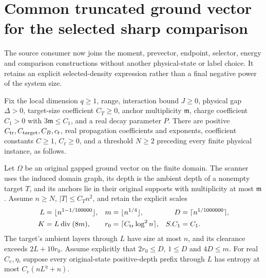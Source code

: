 \section{Common truncated ground vector for the selected sharp comparison}
\label{sec:arealaw-source-selected-sharp-comparison}

The source consumer now joins the moment, prevector, endpoint, selector,
energy and comparison constructions without another physical-state or
label choice. It retains an explicit selected-density expression rather
than a final negative power of the system size.

\begin{lemma}
    \label{thm:arealaw-source-selected-sharp-comparison}
    \leanok
    Fix the local dimension $q\ge1$, range, interaction bound $J\ge0$,
    physical gap $\Delta>0$, target-size coefficient $C_T\ge0$, anchor
    multiplicity $\mathfrak m$, charge coefficient
    $C_1>0$ with $3\mathfrak m\le C_1$, and a real decay parameter $P$.
    There are positive $C_{\rm tr},C_{\rm target},C_B,c_t$, real propagation
    coefficients and exponents, coefficient constants $C\ge1$, $C_\ell\ge0$,
    and a threshold $N\ge2$ preceding
    every finite physical instance, as follows.

    Let $\Omega$ be an original gapped ground vector on the finite domain.
    The scanner uses the induced domain graph, its depth is the ambient
    depth of a nonempty target $T$, and its anchors lie in their original
    supports with multiplicity at most $\mathfrak m$. Assume $n\ge N$,
    $|T|\le C_Tn^2$, and retain the explicit scales
    \begin{align}
        L     & =\lfloor n^{1-1/100000}\rfloor,       &
        m     & =\lfloor n^{1/4}\rfloor,              &
        D     & =\lceil n^{1/1000000}\rceil,\nonumber   \\
        K     & =L\mathbin{\mathrm{div}}(8m),         &
        r_0   & =\lceil C_{\rm tr}\log^2n\rceil,      &
        S.C_1 & =C_1.
        \label{eq:arealaw-source-selected-scales}
    \end{align}
    The target's ambient layers through $L$ have size at most $n$,
    and its clearance exceeds $2L+10r_0$. Assume explicitly that
    $2r_0\le D$, $1\le D$ and $4D\le m$.
    For real $C_e,\eta$, suppose every original-state positive-depth
    prefix through $L$ has entropy at most $C_e(nL^\eta+n)$.


\end{lemma}
